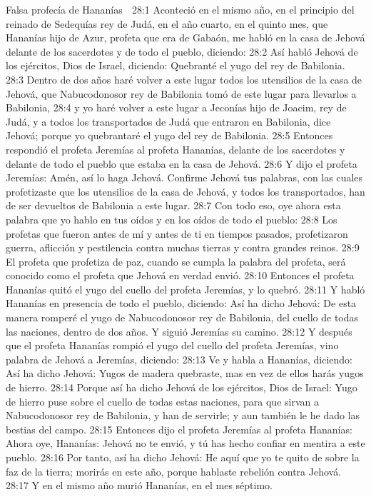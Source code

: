 Falsa profecía de Hananías  

28:1 Aconteció en el mismo año, en el principio del reinado de Sedequías rey de Judá, en el año cuarto, en el quinto mes, que Hananías hijo de Azur, profeta que era de Gabaón, me habló en la casa de Jehová delante de los sacerdotes y de todo el pueblo, diciendo:  
28:2 Así habló Jehová de los ejércitos, Dios de Israel, diciendo: Quebranté el yugo del rey de Babilonia.  
28:3 Dentro de dos años haré volver a este lugar todos los utensilios de la casa de Jehová, que Nabucodonosor rey de Babilonia tomó de este lugar para llevarlos a Babilonia,  
28:4 y yo haré volver a este lugar a Jeconías hijo de Joacim, rey de Judá, y a todos los transportados de Judá que entraron en Babilonia, dice Jehová; porque yo quebrantaré el yugo del rey de Babilonia.  
28:5 Entonces respondió el profeta Jeremías al profeta Hananías, delante de los sacerdotes y delante de todo el pueblo que estaba en la casa de Jehová.  
28:6 Y dijo el profeta Jeremías: Amén, así lo haga Jehová. Confirme Jehová tus palabras, con las cuales profetizaste que los utensilios de la casa de Jehová, y todos los transportados, han de ser devueltos de Babilonia a este lugar.  
28:7 Con todo eso, oye ahora esta palabra que yo hablo en tus oídos y en los oídos de todo el pueblo: 
28:8 Los profetas que fueron antes de mí y antes de ti en tiempos pasados, profetizaron guerra, aflicción y pestilencia contra muchas tierras y contra grandes reinos.  
28:9 El profeta que profetiza de paz, cuando se cumpla la palabra del profeta, será conocido como el profeta que Jehová en verdad envió.  
28:10 Entonces el profeta Hananías quitó el yugo del cuello del profeta Jeremías, y lo quebró.  
28:11 Y habló Hananías en presencia de todo el pueblo, diciendo: Así ha dicho Jehová: De esta manera romperé el yugo de Nabucodonosor rey de Babilonia, del cuello de todas las naciones, dentro de dos años. Y siguió Jeremías su camino.  
28:12 Y después que el profeta Hananías rompió el yugo del cuello del profeta Jeremías, vino palabra de Jehová a Jeremías, diciendo:  
28:13 Ve y habla a Hananías, diciendo: Así ha dicho Jehová: Yugos de madera quebraste, mas en vez de ellos harás yugos de hierro.  
28:14 Porque así ha dicho Jehová de los ejércitos, Dios de Israel: Yugo de hierro puse sobre el cuello de todas estas naciones, para que sirvan a Nabucodonosor rey de Babilonia, y han de servirle; y aun también le he dado las bestias del campo.  
28:15 Entonces dijo el profeta Jeremías al profeta Hananías: Ahora oye, Hananías: Jehová no te envió, y tú has hecho confiar en mentira a este pueblo.  
28:16 Por tanto, así ha dicho Jehová: He aquí que yo te quito de sobre la faz de la tierra; morirás en este año, porque hablaste rebelión contra Jehová.  
28:17 Y en el mismo año murió Hananías, en el mes séptimo.  

